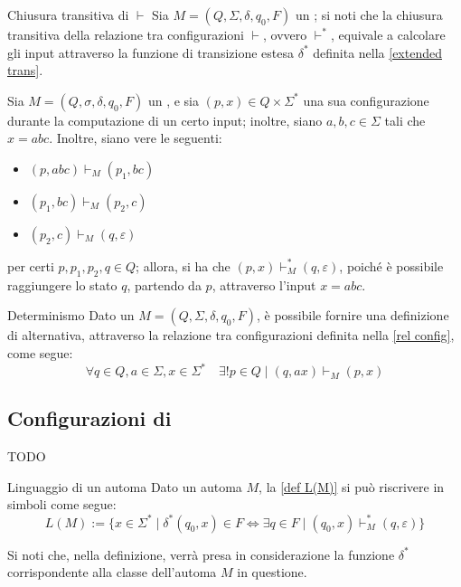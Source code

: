 \documentclass[a4paper, 12pt]{report}
\begin{document}
    \begin{framedobs}{Chiusura transitiva di $\vdash$}
        Sia $M = (Q, \Sigma, \delta, q_0, F)$ un \DFA; si noti che la chiusura transitiva della relazione tra configurazioni $\vdash$, ovvero $\vdash^*$, equivale a calcolare gli input attraverso la funzione di transizione estesa $\delta^*$ definita nella \cref{extended trans}.
    \end{framedobs}

    \begin{example}
        Sia $M = (Q, \sigma, \delta, q_0, F)$ un \DFA, e sia $(p, x) \in Q \times \Sigma ^*$ una sua configurazione durante la computazione di un certo input; inoltre, siano $a, b, c \in \Sigma$ tali che $x = abc$. Inoltre, siano vere le seguenti:

        \begin{itemize}
            \item $(p, abc) \vdash_M (p_1, bc)$
            \item $(p_1, bc) \vdash_M (p_2, c)$
            \item $(p_2, c) \vdash_M (q, \varepsilon)$
        \end{itemize}

        per certi $p, p_1, p_2, q \in Q$; allora, si ha che $(p, x) \vdash_M^* (q, \varepsilon)$, poiché è possibile raggiungere lo stato $q$, partendo da $p$, attraverso l'input $x = abc$.
    \end{example}

    \begin{framedobs}{Determinismo}
        Dato un \DFA $M = (Q, \Sigma, \delta, q_0, F)$, è possibile fornire una definizione di  alternativa, attraverso la relazione tra configurazioni definita nella \cref{rel config}, come segue: $$\forall q \in Q, a \in \Sigma, x \in \Sigma ^* \quad \exists ! p \in Q \mid (q, ax) \vdash_M (p, x)$$
    \end{framedobs}

    \subsection{Configurazioni di \NFA}

    TODO

    \begin{framedobs}{Linguaggio di un automa}
        Dato un automa $M$, la \cref{def L(M)} si può riscrivere in simboli come segue: $$L(M) := \{x \in \Sigma ^* \mid \delta^*(q_0, x) \in F \iff \exists q \in F \mid (q_0, x) \vdash_M^* (q, \varepsilon)\}$$

        Si noti che, nella definizione, verrà presa in considerazione la funzione $\delta^*$ corrispondente alla classe dell'automa $M$ in questione.
    \end{framedobs}
\end{document}
